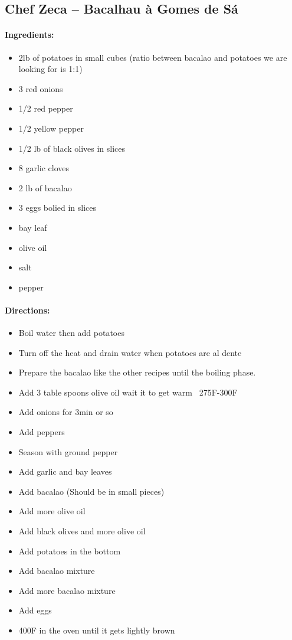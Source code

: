 \documentclass{article}
\begin{document}
\subsection{Chef Zeca – Bacalhau à Gomes de Sá}

\paragraph{Ingredients:}

\begin{itemize}
	\item 2lb of potatoes in small cubes (ratio between bacalao and potatoes we are looking for is 1:1)
	\item 3 red onions
	\item 1/2 red pepper
	\item 1/2 yellow pepper
	\item 1/2 lb of black olives in slices
	\item 8 garlic cloves
	\item 2 lb of bacalao
	\item 3 eggs bolied in slices
	\item bay leaf
	\item olive oil
	\item salt
	\item pepper
\end{itemize}

\paragraph{Directions:}
\begin{itemize}
	\item Boil water then add potatoes
	\item Turn off the heat and drain water when potatoes are al dente
	\item Prepare the bacalao like the other recipes until the boiling phase.
	\item Add 3 table spoons olive oil wait it to get warm ~275F-300F
	\item Add onions for 3min or so
	\item Add peppers
	\item Season with ground pepper
	\item Add garlic and bay leaves
	\item Add bacalao (Should be in small pieces)
	\item Add more olive oil
	\item Add black olives and more olive oil
	\item Add potatoes in the bottom
	\item Add bacalao mixture
	\item Add more bacalao mixture
	\item Add eggs
	\item 400F in the oven until it gets lightly brown
\end{itemize}
\end{document}
